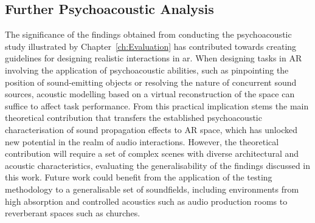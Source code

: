 \subsection{Further Psychoacoustic Analysis}
The significance of the findings obtained from conducting the psychoacoustic study illustrated by Chapter~\ref{ch:Evaluation} has contributed towards creating guidelines for designing realistic interactions in \acrshort{ar}. When designing tasks in AR involving the application of psychoacoustic abilities, such as pinpointing the position of sound-emitting objects or resolving the nature of concurrent sound sources, acoustic modelling based on a virtual reconstruction of the space can suffice to affect task performance. From this practical implication stems the main theoretical contribution that transfers the established psychoacoustic characterisation of sound propagation effects to AR space, which has unlocked new potential in the realm of audio interactions. However, the theoretical contribution will require a set of complex scenes with diverse architectural and acoustic characteristics, evaluating the generalisability of the findings discussed in this work. Future work could benefit from the application of the testing methodology to a generalisable set of soundfields, including environments from high absorption and controlled acoustics such as audio production rooms to reverberant spaces such as churches.\par



